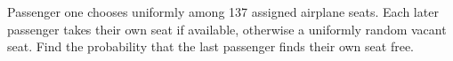 Passenger one chooses uniformly among 137 assigned airplane seats. Each later passenger takes their own seat if available, otherwise a uniformly random vacant seat. Find the probability that the last passenger finds their own seat free.
